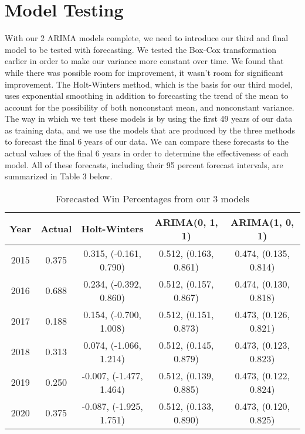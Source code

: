 \documentclass[12pt]{article}
\begin{document}
\section{Model Testing}\label{sec:chapter}
With our 2 ARIMA models complete, we need to introduce our third and final model to be tested with forecasting. We tested the Box-Cox transformation earlier in order to make our variance more constant over time. We found that while there was possible room for improvement, it wasn't room for significant improvement. The Holt-Winters method, which is the basis for our third model, uses exponential smoothing in addition to forecasting the trend of the mean to account for the possibility of both nonconstant mean, and nonconstant variance. The way in which we test these models is by using the first 49 years of our data as training data, and we use the models that are produced by the three methods to forecast the final 6 years of our data. We can compare these forecasts to the actual values of the final 6 years in order to determine the effectiveness of each model. All of these forecasts, including their 95 percent forecast intervals, are summarized in Table 3 below.\\
\newpage
\begin{table}[h]
\begin{center}
\begin{tabular}{ |c|c|c|c|c| } 
 \hline
 \textbf{Year} & \textbf{Actual} & \textbf{Holt-Winters} & \textbf{ARIMA(0, 1, 1)} & \textbf{ARIMA(1, 0, 1)} \\
 \hline
 2015 & 0.375 & 0.315, (-0.161, 0.790) & 0.512, (0.163, 0.861) & 0.474, (0.135, 0.814)\\ 
 \hline
 2016 & 0.688 & 0.234, (-0.392, 0.860) & 0.512, (0.157, 0.867) & 0.474, (0.130, 0.818)\\ 
 \hline
 2017 & 0.188 & 0.154, (-0.700, 1.008) & 0.512, (0.151, 0.873) & 0.473, (0.126, 0.821)\\ 
 \hline
 2018 & 0.313 & 0.074, (-1.066, 1.214) & 0.512, (0.145, 0.879) & 0.473, (0.123, 0.823)\\ 
 \hline
 2019 & 0.250 & -0.007, (-1.477, 1.464) & 0.512, (0.139, 0.885) & 0.473, (0.122, 0.824)\\ 
 \hline
 2020 & 0.375 & -0.087, (-1.925, 1.751) & 0.512, (0.133, 0.890) & 0.473, (0.120, 0.825)\\ 
 \hline
\end{tabular}
\caption{Forecasted Win Percentages from our 3 models}
\label{table:Table 3}
\end{center}
\end{table}
\end{document}
